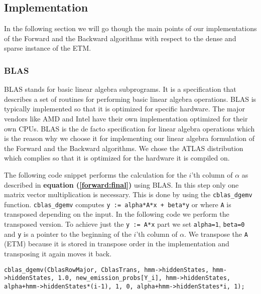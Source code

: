 \subsection{Implementation}\label{sec:impel}

In the following section we will go though the main points of our implementations of the Forward and the Backward algorithms with respect to the dense and sparse instance of the ETM.

\subsubsection{BLAS}\label{sec:blas}
BLAS\cite{blackford2002updated} stands for basic linear algebra subprograms. It is a specification that describes a set of routines for performing basic linear algebra operations. BLAS is typically implemented so that it is optimized for specific hardware. The major vendors like AMD\cite{amd} and Intel\cite{intel} have their own implementation optimized for their own CPUs. BLAS is the de facto specification for linear algebra operations which is the reason why we choose it for implementing our linear algebra formulation of the Forward and the Backward algorithms. We chose the ATLAS\cite{ATLAS} distribution which complies so that it is optimized for the hardware it is compiled on.


The following code snippet performs the calculation for the $i$'th column of $\alpha$ as described in \textbf{equation (\ref{forward:final})} using BLAS. In this step only one matrix vector multiplication is necessary. This is done by using the \texttt{cblas\_dgemv} function. \texttt{cblas\_dgemv} computes \texttt{y := alpha*A*x + beta*y} or where \texttt{A} is transposed depending on the input. In the following code we perform the transposed version. To achieve just the \texttt{y := A*x} part we set \texttt{alpha=1}, \texttt{beta=0} and \texttt{y} is a pointer to the beginning of the $i$'th column of $\alpha$. We transpose the \texttt{A} (ETM) because it is stored in transpose order in the implementation and transposing it again moves it back.


\begin{lstlisting}[style=CStyle]
cblas_dgemv(CblasRowMajor, CblasTrans, hmm->hiddenStates, hmm->hiddenStates, 1.0, new_emission_probs[Y_i], hmm->hiddenStates, alpha+hmm->hiddenStates*(i-1), 1, 0, alpha+hmm->hiddenStates*i, 1);
\end{lstlisting}


